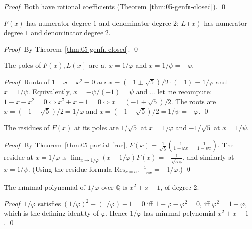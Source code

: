 \begin{proof}
Both have rational coefficients (Theorem~\ref{thm:05-genfn-closed}). \qed
\end{proof}

\begin{lemma}
\label{lem:05-degree}
$F(x)$ has numerator degree $1$ and denominator degree $2$;
$L(x)$ has numerator degree $1$ and denominator degree $2$.
\end{lemma}

\begin{proof}
By Theorem~\ref{thm:05-genfn-closed}. \qed
\end{proof}

\begin{lemma}
\label{lem:05-pole-locations}
The poles of $F(x), L(x)$ are at $x = 1/\varphi$ and $x = 1/\psi = -\varphi$.
\end{lemma}

\begin{proof}
Roots of $1 - x - x^2 = 0$ are $x = (-1 \pm \sqrt{5})/2 \cdot (-1) = 1/\varphi$
and $x = 1/\psi$. Equivalently, $x = -\psi/(-1) = \psi$ and ... let me
recompute: $1 - x - x^2 = 0 \iff x^2 + x - 1 = 0 \iff x = (-1 \pm \sqrt{5})/2$.
The roots are $x = (-1 + \sqrt{5})/2 = 1/\varphi$ and
$x = (-1 - \sqrt{5})/2 = 1/\psi = -\varphi$. \qed
\end{proof}

\begin{lemma}
\label{lem:05-pole-residue}
The residues of $F(x)$ at its poles are $1/\sqrt{5}$ at $x = 1/\varphi$
and $-1/\sqrt{5}$ at $x = 1/\psi$.
\end{lemma}

\begin{proof}
By Theorem~\ref{thm:05-partial-frac}, $F(x) = \frac{1}{\sqrt{5}} (\frac{1}{1-\varphi x}
- \frac{1}{1-\psi x})$. The residue at $x = 1/\varphi$ is
$\lim_{x \to 1/\varphi} (x - 1/\varphi) F(x) = -\frac{1}{\sqrt{5}\varphi}$, and
similarly at $x = 1/\psi$. (Using the residue formula
$\mathrm{Res}_{x=a} \frac{1}{1-\varphi x} = -1/\varphi$.) \qed
\end{proof}

\begin{lemma}
\label{lem:05-degree-Q-phi}
The minimal polynomial of $1/\varphi$ over $\mathbb{Q}$ is $x^2 + x - 1$,
of degree $2$.
\end{lemma}

\begin{proof}
$1/\varphi$ satisfies $(1/\varphi)^2 + (1/\varphi) - 1 = 0$ iff
$1 + \varphi - \varphi^2 = 0$, iff $\varphi^2 = 1 + \varphi$, which is the
defining identity of $\varphi$. Hence $1/\varphi$ has minimal polynomial
$x^2 + x - 1$. \qed
\end{proof}

